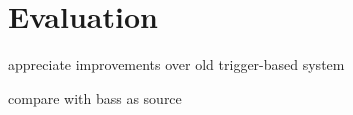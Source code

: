 \section{Evaluation}

appreciate improvements over old trigger-based system

compare with bass as source
